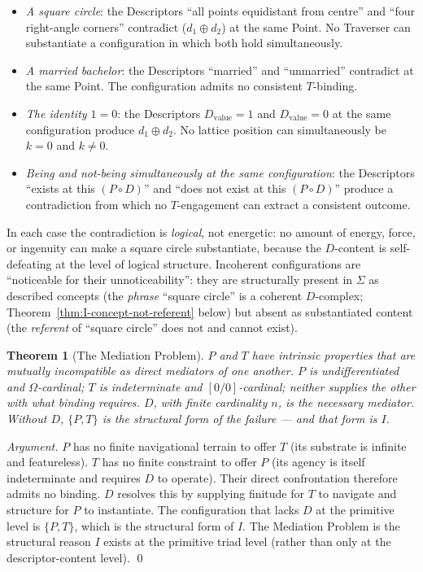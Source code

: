 \documentclass[11pt,a4paper]{article}
\newtheorem{theorem}{Theorem}[section]
\theoremstyle{definition}
\theoremstyle{remark}
\begin{document}
\begin{itemize}[leftmargin=*]
\item \emph{A square circle}: the Descriptors ``all points equidistant from centre'' and ``four right-angle corners'' contradict ($d_{1} \oplus d_{2}$) at the same Point. No Traverser can substantiate a configuration in which both hold simultaneously.
\item \emph{A married bachelor}: the Descriptors ``married'' and ``unmarried'' contradict at the same Point. The configuration admits no consistent $T$-binding.
\item \emph{The identity $1 = 0$}: the Descriptors $D_{\mathrm{value}} = 1$ and $D_{\mathrm{value}} = 0$ at the same configuration produce $d_{1} \oplus d_{2}$. No lattice position can simultaneously be $k = 0$ and $k \neq 0$.
\item \emph{Being and not-being simultaneously at the same configuration}: the Descriptors ``exists at this $(P \circ D)$'' and ``does not exist at this $(P \circ D)$'' produce a contradiction from which no $T$-engagement can extract a consistent outcome.
\end{itemize}

In each case the contradiction is \emph{logical}, not energetic: no amount of energy, force, or ingenuity can make a square circle substantiate, because the $D$-content is self-defeating at the level of logical structure. Incoherent configurations are ``noticeable for their unnoticeability'': they are structurally present in $\Sigma$ as described concepts (the \emph{phrase} ``square circle'' is a coherent $D$-complex; Theorem~\ref{thm:I-concept-not-referent} below) but absent as substantiated content (the \emph{referent} of ``square circle'' does not and cannot exist).

\begin{theorem}[The Mediation Problem]\label{thm:mediation-problem}
$P$ and $T$ have intrinsic properties that are mutually incompatible as direct mediators of one another. $P$ is undifferentiated and $\Omega$-cardinal; $T$ is indeterminate and $[0/0]$-cardinal; neither supplies the other with what binding requires. $D$, with finite cardinality $n$, is the necessary mediator. Without $D$, $\{P,T\}$ is the structural form of the failure --- and that form is $I$.
\end{theorem}

\begin{proof}[Argument]
$P$ has no finite navigational terrain to offer $T$ (its substrate is infinite and featureless). $T$ has no finite constraint to offer $P$ (its agency is itself indeterminate and requires $D$ to operate). Their direct confrontation therefore admits no binding. $D$ resolves this by supplying finitude for $T$ to navigate and structure for $P$ to instantiate. The configuration that lacks $D$ at the primitive level is $\{P,T\}$, which is the structural form of $I$. The Mediation Problem is the structural reason $I$ exists at the primitive triad level (rather than only at the descriptor-content level). \qed
\end{proof}
\end{document}
